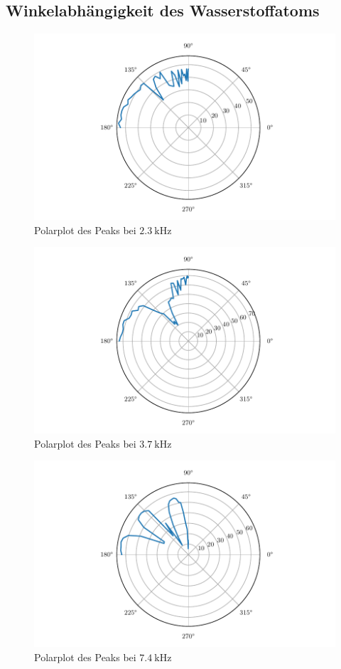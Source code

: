 \subsection{Winkelabhängigkeit des Wasserstoffatoms}
\begin{figure}
    \centering
    \includegraphics{build/hvarangle27.pdf}
    \caption{Polarplot des Peaks bei $\qty{2.3}{\kilo\hertz}$}
    \label{pic:hvarangle27}
\end{figure}
\begin{figure}
    \centering
    \includegraphics{build/hvarangle37.pdf}
    \caption{Polarplot des Peaks bei $\qty{3.7}{\kilo\hertz}$}
    \label{pic:hvarangle37}
\end{figure}
\begin{figure}
    \centering
    \includegraphics{build/hvarangle74.pdf}
    \caption{Polarplot des Peaks bei $\qty{7.4}{\kilo\hertz}$}
    \label{pic:hvarangle74}
\end{figure}
